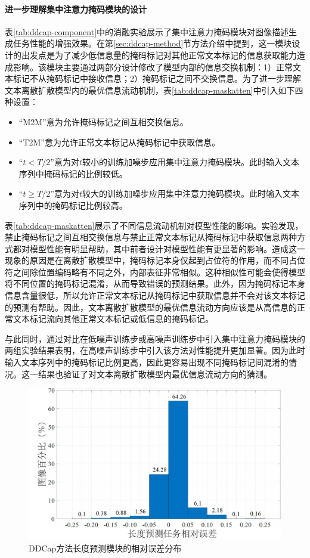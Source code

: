 \paragraph{进一步理解集中注意力掩码模块的设计} 表\ref{tab:ddcap-component}中的消融实验展示了集中注意力掩码模块对图像描述生成任务性能的增强效果。在第\ref{sec:ddcap-method}节方法介绍中提到，这一模块设计的出发点是为了减少低信息量的掩码标记对其他正常文本标记的信息获取能力造成影响。该模块主要通过两部分设计修改了模型内部的信息交换机制：1）正常文本标记不从掩码标记中接收信息；2）掩码标记之间不交换信息。为了进一步理解文本离散扩散模型内的最优信息流动机制，表\ref{tab:ddcap-maskatten}中引入如下四种设置：
\begin{itemize}
    \item “M2M”意为允许掩码标记之间互相交换信息。
    \item “T2M”意为允许正常文本标记从掩码标记中获取信息。
    \item “$t < T/2$”意为对$t$较小的训练加噪步应用集中注意力掩码模块。此时输入文本序列中掩码标记的比例较低。
    \item “$t\geq T/2$”意为对$t$较大的训练加噪步应用集中注意力掩码模块。此时输入文本序列中的掩码标记比例较高。
\end{itemize}
 
表\ref{tab:ddcap-maskatten}展示了不同信息流动机制对模型性能的影响。实验发现，禁止掩码标记之间互相交换信息与禁止正常文本标记从掩码标记中获取信息两种方式都对模型性能有明显帮助，其中前者设计对模型性能有更显著的影响。造成这一现象的原因是在离散扩散模型中，掩码标记本身仅起到占位符的作用，而不同占位符之间除位置编码略有不同之外，内部表征非常相似。这种相似性可能会使得模型将不同位置的掩码标记混淆，从而导致错误的预测结果。此外，因为掩码标记本身信息含量很低，所以允许正常文本标记从掩码标记中获取信息并不会对该文本标记的预测有帮助。因此，文本离散扩散模型的最优信息流动方向应该是从高信息的正常文本标记流向其他正常文本标记或低信息的掩码标记。

与此同时，通过对比在低噪声训练步或高噪声训练步中引入集中注意力掩码模块的两组实验结果表明，在高噪声训练步中引入该方法对性能提升更加显著。因为此时输入文本序列中的掩码标记比例更高，因此更容易出现不同掩码标记间混淆的情况。这一结果也验证了对文本离散扩散模型内最优信息流动方向的猜测。

\begin{figure}
  \centering
  \includegraphics[width=0.7\linewidth]{figures/ddcap-length.pdf}
  \caption{DDCap方法长度预测模块的相对误差分布}
  \label{fig:ddcap-length}
\end{figure}

